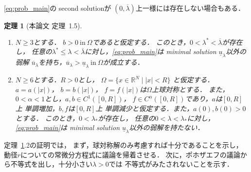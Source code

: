 \documentclass{jsarticle}
\newcommand{\sage}{
\addtolength{\itemindent}{1zw}
\addtolength{\parindent}{1zw}}
\theoremstyle{plain}
\newtheorem{thm}{定理}
\renewcommand{\bar}[1]{\overline{#1}}
\newcommand{\R}{\mathbb{R}}
\newcommand{\tin}{\text{in}~}
\begin{document}
\ref{eq:prob_main}の second solutionが
$(0, \bar{\lambda})$上一様には存在しない場合もある．

\begin{thm}[本論文 定理~1.5] \label{thm:second_solution_nonex}
 \begin{enumerate}[1.]  \sage
  \item $N \geq 3$とする．
        $b > 0 ~\tin \Omega$であると仮定する．
        このとき，$0 < \lambda^* < \bar{\lambda}$が存在し，
        任意の$\lambda^* \leq
        \lambda < \bar{\lambda}$に対し，\ref{eq:prob_main}は
        minimal solution $\underline{u}_\lambda$以外の弱解
        $\bar{u}_\lambda$を持ち，$\bar{u}_\lambda >
        \underline{u}_\lambda ~\tin \Omega$が成立する．
  \item $N \geq 6$とする．$R > 0$とし，
        $\Omega = \{ x \in \R^N \mid \lvert x \rvert < R\}$
        と仮定する．
        $a = a(\lvert x \rvert)$，
        $b = b(\lvert x \rvert)$，
        $f = f(\lvert x \rvert)$は$\Omega$上球対称とする．
        また，$0 < \alpha < 1$とし，$a , b \in C^1([0, R])$，
        $f \in C^\alpha([0, R])$であり，$a$は$[0, R]$上
        単調増加，$b, f$は$[0, R]$上
        単調減少と仮定する．また，$a(0), b(0) > 0$とする．
        このとき，$0 < \lambda_*$が存在し，
        任意の$0 < \lambda < \lambda_*$に対し，
        \ref{eq:prob_main}は
        minimal solution $\underline{u}_\lambda$以外の弱解を持たない．
 \end{enumerate}
\end{thm}

定理~\ref{thm:second_solution_nonex}.2の証明では，
まず，球対称解のみ考慮すれば十分であることを示し，
動径$r$についての常微分方程式に議論を帰着させる．
次に，ポホザエフの議論から不等式を出し，十分小さい$\lambda > 0$では
不等式がみたされないことを示す．



\end{document}

